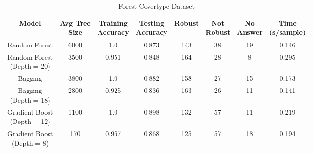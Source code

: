 \documentclass[pageno]{jpaper}
\begin{document}
\begin{doublespacing}
\begin{table}[p]
\centering
\begin{tabular}{| c | c c c c c c c |} 
 \hline
 Model & \makecell{Avg Tree \\ Size} & \makecell{Training \\ Accuracy} & \makecell{Testing \\ Accuracy} & Robust & \makecell{Not \\ Robust} & \makecell{No \\ Answer} & \makecell{Time  \\ (s/sample)} \\ [0.5ex] 
 \hline\hline
Random Forest 					& 6000 & 1.0 & 0.873 & 143 & 38 & 19 & 0.146 \\ \hline
\makecell{Random Forest \\ (Depth = 20)} & 3500 & 0.951 & 0.848 & 164 & 28 & 8 & 0.295 \\ \hline
Bagging 						& 3800 & 1.0 & 0.882 & 158 & 27 & 15 & 0.173 \\ \hline
\makecell{Bagging \\ (Depth = 18)}		& 2800 & 0.925 & 0.836 & 163 & 26 & 11 & 0.141 \\ \hline
\makecell{Gradient Boost \\ (Depth = 12)}	& 1100 & 1.0 & 0.898 & 132 & 57 & 11 & 0.219 \\ \hline
\makecell{Gradient Boost \\ (Depth = 8)} 	& 170 & 0.967 & 0.868 & 125 & 57 & 18 & 0.194 \\ [1ex] 
 \hline
\end{tabular}
\caption{Forest Covertype Dataset}
\label{table:covtype}
\end{table}


\end{doublespacing}
\end{document}
